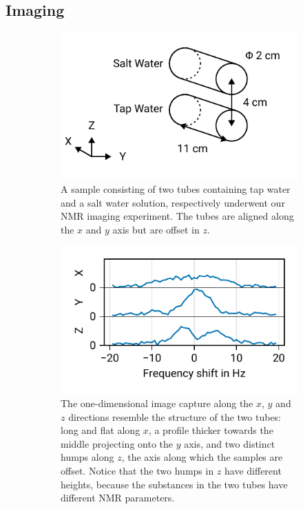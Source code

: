 \documentclass[
    parskip=half, 
    twoside=false,
    twocolumn=true,
    fontsize=11pt,
]{scrarticle}
\begin{document}
\subsection{Imaging}
\begin{figure}
    \centering
    \begin{subfigure}[c]{.45\textwidth}
        \includegraphics{figures/07 sample holder.pdf}
        \caption{A sample consisting of two tubes containing tap water and a salt water solution, respectively underwent our NMR imaging experiment. The tubes are aligned along the $x$ and $y$ axis but are offset in $z$.}
        \label{fig:sample}
    \end{subfigure}
    \begin{subfigure}[c]{.45\textwidth}
        \includegraphics{figures/07 1d imaging.pdf}
        \caption{The one-dimensional image capture along the $x$, $y$ and $z$ directions resemble the structure of the two tubes: long and flat along $x$, a profile thicker towards the middle projecting onto the $y$ axis, and two distinct humps along $z$, the axis along which the samples are offset. Notice that the two humps in $z$ have different heights, because the substances in the two tubes have different NMR parameters.}
        \label{fig:1d_image}
    \end{subfigure}
    \caption{}
\end{figure}
\end{document}
